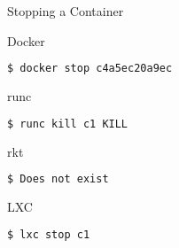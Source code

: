 \begin{frame}[fragile]{Stopping a Container}

\begin{block}{Docker}
\begin{lstlisting}[language=bash,keywordstyle=\bf,stringstyle=\it,basicstyle=\tiny]
$ docker stop c4a5ec20a9ec
\end{lstlisting}
\end{block}

\begin{block}{runc}
\begin{lstlisting}[language=bash,keywordstyle=\bf,stringstyle=\it,basicstyle=\tiny]
$ runc kill c1 KILL
\end{lstlisting}
\end{block}



\begin{block}{rkt}
\begin{lstlisting}[language=bash,keywordstyle=\bf,stringstyle=\it,basicstyle=\tiny]
$ Does not exist
\end{lstlisting}
\end{block}

\begin{block}{LXC}
\begin{lstlisting}[language=bash,keywordstyle=\bf,stringstyle=\it,basicstyle=\tiny]
$ lxc stop c1
\end{lstlisting}
\end{block}

\end{frame}